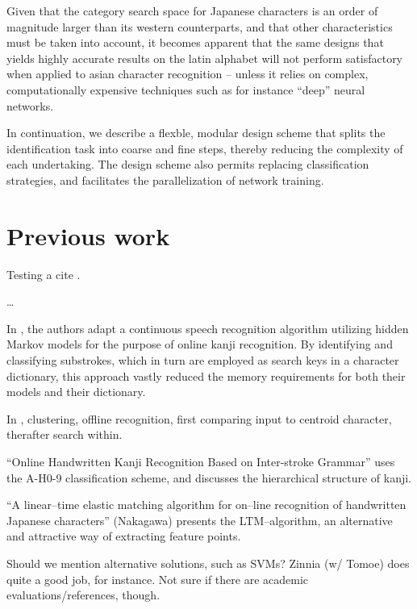 \documentclass[10pt,conference,a4paper]{IEEEtran}
\begin{document}
	Given that the category search space for Japanese characters is an order of magnitude larger than its western counterparts,
	and that other characteristics must be taken into account, it becomes apparent that the same designs that
	yields highly accurate results on the latin alphabet will not perform satisfactory when applied to asian character recognition \cite{tappert1990state, liu2004online}
	-- unless it relies on complex, computationally expensive techniques such as for instance ``deep'' neural networks. \cite{ciresan2012multi}

	In continuation, we describe a flexble, modular design scheme that splits the identification task into coarse and fine steps,
	thereby reducing the complexity of each undertaking. The design scheme also permits replacing classification strategies,
	and facilitates the parallelization of network training.




	 
	\section{Previous work}
	\label{sec:previous_work}

	Testing a cite \cite{zhu2014robust}.

	\ldots

	In \cite{nakai2001substroke}, the authors adapt a continuous speech recognition algorithm utilizing
	hidden Markov models for the purpose of online kanji recognition. By identifying and classifying
	substrokes, which in turn are employed as search keys in a character dictionary, this approach vastly
	reduced the memory requirements for both their models and their dictionary.

	
	In \cite{yang2003accelerating}, clustering, offline recognition, first comparing input to centroid character,
	therafter search within.


	``Online Handwritten Kanji Recognition Based on Inter-stroke Grammar'' uses the A-H0-9 classification scheme,
	and discusses the hierarchical structure of kanji.

	``A linear--time elastic matching algorithm for on--line recognition of handwritten Japanese characters'' (Nakagawa)
	presents the LTM--algorithm, an alternative and attractive way of extracting feature points.

	Should we mention alternative solutions, such as SVMs? Zinnia (w/ Tomoe) does quite a good job, for instance. Not sure if there
	are academic evaluations/references, though.
\end{document}
